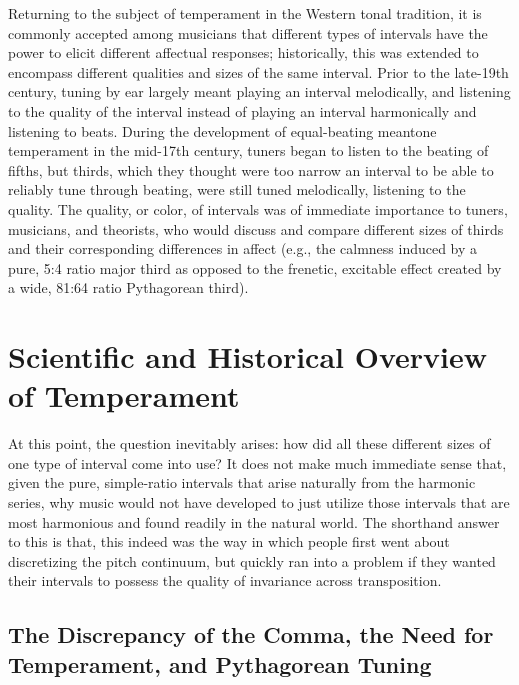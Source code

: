 Returning to the subject of temperament in the Western tonal tradition,
it is commonly accepted among musicians that different types of
intervals have the power to elicit different affectual responses;
historically, this was extended to encompass different qualities and
sizes of the same interval. Prior to the late-19th century, tuning by
ear largely meant playing an interval melodically, and listening to the
quality of the interval instead of playing an interval harmonically and
listening to beats. During the development of equal-beating meantone
temperament in the mid-17th century, tuners began to listen to the
beating of fifths, but thirds, which they thought were too narrow an
interval to be able to reliably tune through beating, were still tuned
melodically, listening to the quality. The quality, or color, of
intervals was of immediate importance to tuners, musicians, and
theorists, who would discuss and compare different sizes of thirds and
their corresponding differences in affect (e.g., the calmness induced by
a pure, 5:4 ratio major third as opposed to the frenetic, excitable
effect created by a wide, 81:64 ratio Pythagorean third).

    \section{Scientific and Historical Overview of
Temperament}\label{scientific-and-historical-overview-of-temperament}

At this point, the question inevitably arises: how did all these
different sizes of one type of interval come into use? It does not make
much immediate sense that, given the pure, simple-ratio intervals that
arise naturally from the harmonic series, why music would not have
developed to just utilize those intervals that are most harmonious and
found readily in the natural world. The shorthand answer to this is
that, this indeed was the way in which people first went about
discretizing the pitch continuum, but quickly ran into a problem if they
wanted their intervals to possess the quality of invariance across
transposition.

\subsection{The Discrepancy of the Comma, the Need for Temperament, and
Pythagorean
Tuning}\label{the-discrepancy-of-the-comma-the-need-for-temperament-and-pythagorean-tuning}

